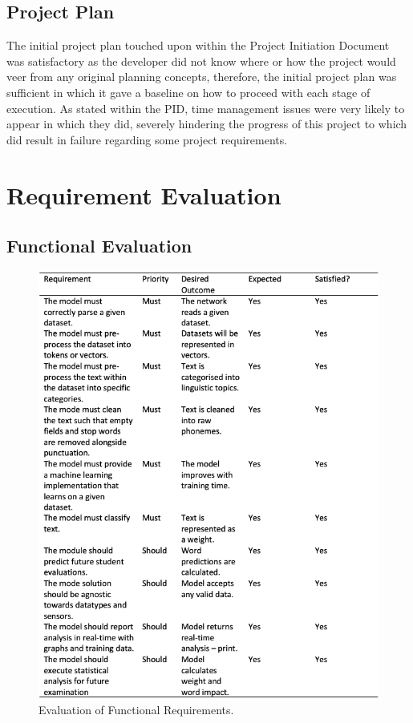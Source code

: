 \subsection{Project Plan}

The initial project plan touched upon within the Project Initiation Document was satisfactory as the developer did not know where or how the project would veer from any original planning concepts, therefore, the initial project plan was sufficient in which it gave a baseline on how to proceed with each stage of execution. As stated within the PID, time management issues were very likely to appear in which they did, severely hindering the progress of this project to which did result in failure regarding some project requirements.

\section{Requirement Evaluation}

\subsection{Functional Evaluation}

\begin{figure}[H]
    \centering
    \includegraphics[width=\textwidth]{figures/chapter-7/FunctionalEval.png}
    \caption[Evaluation of Functional Requirements]{Evaluation of Functional Requirements.
    \label{fig:FunctionalEval}}
\end{figure}

